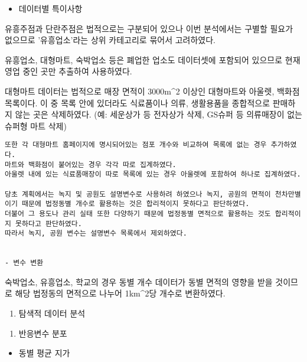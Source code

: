 \documentclass[]{article}
\providecommand{\tightlist}{%
  \setlength{\itemsep}{0pt}\setlength{\parskip}{0pt}}
\begin{document}
\begin{itemize}
\tightlist
\item
  데이터별 특이사항
\end{itemize}

유흥주점과 단란주점은 법적으로는 구분되어 있으나 이번 분석에서는 구별할
필요가 없으므로 '유흥업소'라는 상위 카테고리로 묶어서 고려하였다.

유흥업소, 대형마트, 숙박업소 등은 폐업한 업소도 데이터셋에 포함되어
있으므로 현재 영업 중인 곳만 추출하여 사용하였다.

대형마트 데이터는 법적으로 매장 면적이 3000m\^{}2 이상인 대형마트와
아울렛, 백화점 목록이다. 이 중 목록 안에 있더라도 식료품이나 의류,
생활용품을 종합적으로 판매하지 않는 곳은 삭제하였다. (예: 세운상가 등
전자상가 삭제, GS슈퍼 등 의류매장이 없는 슈퍼형 마트 삭제)

\begin{verbatim}
또한 각 대형마트 홈페이지에 명시되어있는 점포 개수와 비교하여 목록에 없는 경우 추가하였다.
마트와 백화점이 붙어있는 경우 각각 따로 집계하였다.
아울렛 내에 있는 식료품매장이 따로 목록에 있는 경우 아울렛에 포함하여 하나로 집계하였다.

당초 계획에서는 녹지 및 공원도 설명변수로 사용하려 하였으나 녹지, 공원의 면적이 천차만별이기 때문에 법정동별 개수로 활용하는 것은 합리적이지 못하다고 판단하였다.
더불어 그 용도나 관리 실태 또한 다양하기 때문에 법정동별 면적으로 활용하는 것도 합리적이지 못하다고 판단하였다.
따라서 녹지, 공원 변수는 설명변수 목록에서 제외하였다.


- 변수 변환
\end{verbatim}

숙박업소, 유흥업소, 학교의 경우 동별 개수 데이터가 동별 면적의 영향을
받을 것이므로 해당 법정동의 면적으로 나누어 1km\^{}2당 개수로
변환하였다.

\begin{enumerate}
\def\labelenumi{\arabic{enumi}.}
\setcounter{enumi}{2}
\tightlist
\item
  탐색적 데이터 분석
\end{enumerate}

\begin{enumerate}
\def\labelenumi{\arabic{enumi})}
\tightlist
\item
  반응변수 분포
\end{enumerate}

\begin{itemize}
\tightlist
\item
  동별 평균 지가
\end{itemize}
\end{document}
